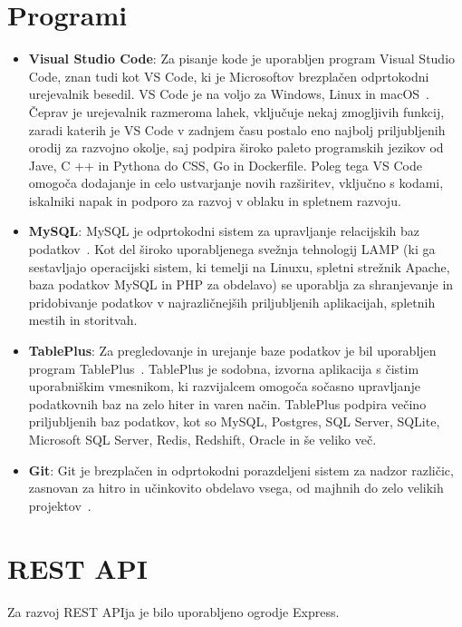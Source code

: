\documentclass[a4paper, 12pt]{book}
\begin{document}
\section{Programi}
 \begin{itemize}
  \item \textbf{Visual Studio Code}: Za pisanje kode je uporabljen program Visual Studio Code, znan tudi kot VS Code, ki je Microsoftov brezplačen odprtokodni urejevalnik besedil. VS Code je na voljo za Windows, Linux in macOS~\cite{VSC}. Čeprav je urejevalnik razmeroma lahek, vključuje nekaj zmogljivih funkcij, zaradi katerih je VS Code v zadnjem času postalo eno najbolj priljubljenih orodij za razvojno okolje, saj podpira široko paleto programskih jezikov od Jave, C ++ in Pythona do CSS, Go in Dockerfile. Poleg tega VS Code omogoča dodajanje in celo ustvarjanje novih razširitev, vključno s kodami, iskalniki napak in podporo za razvoj v oblaku in spletnem razvoju.

 \item \textbf{MySQL}: MySQL je odprtokodni sistem za upravljanje relacijskih baz podatkov~\cite{MySQL}. Kot del široko uporabljenega svežnja tehnologij LAMP (ki ga sestavljajo operacijski sistem, ki temelji na Linuxu, spletni strežnik Apache, baza podatkov MySQL in PHP za obdelavo) se uporablja za shranjevanje in pridobivanje podatkov v najrazličnejših priljubljenih aplikacijah, spletnih mestih in storitvah.

\item \textbf{TablePlus}: Za pregledovanje in urejanje baze podatkov je bil uporabljen program TablePlus~\cite{TablePlus}. TablePlus je sodobna, izvorna aplikacija s čistim uporabniškim vmesnikom, ki razvijalcem omogoča sočasno upravljanje podatkovnih baz na zelo hiter in varen način. TablePlus podpira večino priljubljenih baz podatkov, kot so MySQL, Postgres, SQL Server, SQLite, Microsoft SQL Server, Redis, Redshift, Oracle in še veliko več.

\item \textbf{Git}: Git je brezplačen in odprtokodni porazdeljeni sistem za nadzor različic, zasnovan za hitro in učinkovito obdelavo vsega, od majhnih do zelo velikih projektov~\cite{Git}.
\end{itemize}


\section{REST API}
Za razvoj REST APIja je bilo uporabljeno ogrodje Express. 
\end{document}
